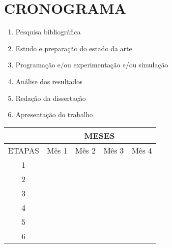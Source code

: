 \chapter{CRONOGRAMA}
\label{ap:modelo-de-capa}

\center

\begin{enumerate}
\item Pesquisa bibliográfica
\item Estudo e preparação do estado da arte
\item Programação e/ou experimentação e/ou simulação
\item Análise dos resultados
\item Redação da dissertação
\item Apresentação do trabalho
\end{enumerate}

\begin{table}[h]
	\centering
	\begin{tabular}{|l|l|l|l|l|}
	\hline
	\multicolumn{1}{|c|}{} &
	\multicolumn{4}{|c|}{MESES} \\
	\hline
	\multicolumn{1}{|c|}{ETAPAS} &
	\multicolumn{1}{c|}{Mês 1} &
	\multicolumn{1}{c|}{Mês 2} &
	\multicolumn{1}{c|}{Mês 3} &
	\multicolumn{1}{c|}{Mês 4} \\
	\hline
        \multicolumn{1}{|c|}{1} &
        \cellcolor[gray]{0.8}\color{black} &
        \multicolumn{1}{c|}{} &
        \multicolumn{1}{c|}{} &
        \multicolumn{1}{c|}{} \\
	\hline
        \multicolumn{1}{|c|}{2} &
        \cellcolor[gray]{0.8}\color{black} &
        \multicolumn{1}{c|}{} &
        \multicolumn{1}{c|}{} &
        \multicolumn{1}{c|}{} \\
	\hline
        \multicolumn{1}{|c|}{3} &
        \multicolumn{1}{c|}{} &
        \cellcolor[gray]{0.8}\color{black} &
        \multicolumn{1}{c|}{} &
        \multicolumn{1}{c|}{} \\
	\hline
        \multicolumn{1}{|c|}{4} &
        \multicolumn{1}{c|}{} &
        \multicolumn{1}{c|}{} &
        \cellcolor[gray]{0.8}\color{black} &
        \multicolumn{1}{c|}{} \\
	\hline
        \multicolumn{1}{|c|}{5} &
        \multicolumn{1}{c|}{} &
        \multicolumn{1}{c|}{} &
        \multicolumn{1}{c|}{} &
        \cellcolor[gray]{0.8}\color{black} \\
	\hline
        \multicolumn{1}{|c|}{6} &
        \multicolumn{1}{c|}{} &
        \multicolumn{1}{c|}{} &
        \multicolumn{1}{c|}{} &
        \cellcolor[gray]{0.8}\color{black} \\
	\hline
	\end{tabular}
\end{table}